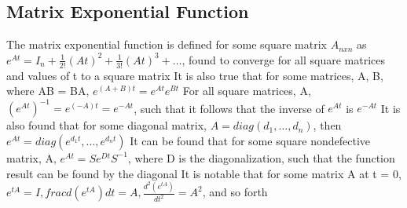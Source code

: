 \documentclass[11 pt, twoside]{article}
\newenvironment{outline*}
{
	\begin{outline}[enumerate]
	}
	{\end{outline}
}
\begin{document}
\subsection{Matrix Exponential Function}
\begin{outline*}
\1 The matrix exponential function is defined for some square matrix $A_{nxn}$ as $e^{At} = I_n + \frac{1}{2!}(At)^2 + \frac{1}{3!}(At)^3 + \dots$, found to converge for all square matrices and values of t to a square matrix
\2 It is also true that for some matrices, A, B, where AB = BA, $e^{(A + B)t} = e^{At}e^{Bt}$
\2 For all square matrices, A, $(e^{At})^{-1} = e^{(-A)t} = e^{-At}$, such that it follows that the inverse of $e^{At}$ is $e^{-At}$
\2 It is also found that for some diagonal matrix, $A = diag(d_1, \dots, d_n)$, then $e^{At} = diag(e^{d_1t}, \dots, e^{d_nt})$
\1 It can be found that for some square nondefective matrix, A, $e^{At} = Se^{Dt}S^{-1}$, where D is the diagonalization, such that the function result can be found by the diagonal
\1 It is notable that for some matrix A at t = 0, $e^{tA} = I, frac{d(e^{tA})}{dt} = A, \frac{d^2(e^{tA})}{dt^2} = A^2$, and so forth
\end{outline*}
\end{document}
